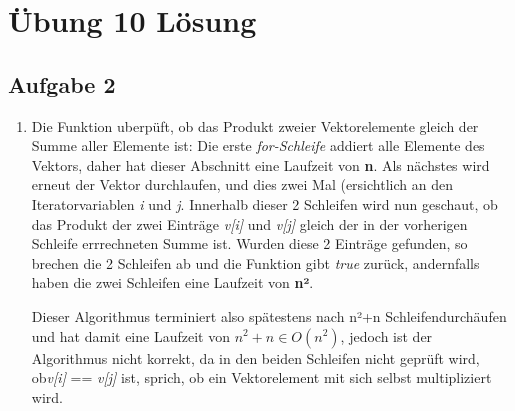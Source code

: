 \documentclass{article}
\begin{document}
\section*{Übung 10 Lösung}

    \subsection*{Aufgabe 2}

    \begin{enumerate}[label=(\alph*)]

        \item Die Funktion uberpüft, ob das Produkt zweier Vektorelemente gleich der Summe aller Elemente ist:
	\newline\newline
	Die erste \textit{for-Schleife} addiert alle Elemente des Vektors, daher hat dieser Abschnitt eine Laufzeit von \textbf{n}.
	Als nächstes wird erneut  der Vektor durchlaufen, und dies zwei Mal (ersichtlich an den Iteratorvariablen \textit{i} und \textit{j}.
	Innerhalb dieser 2 Schleifen wird nun geschaut, ob das Produkt der zwei Einträge \textit{v[i]} und \textit{v[j]} gleich der in der vorherigen Schleife errrechneten
	Summe ist. Wurden diese 2 Einträge gefunden, so brechen die 2 Schleifen ab und die Funktion gibt \textit{true} zurück, andernfalls haben die zwei Schleifen
	eine Laufzeit von \textbf{n²}.

	Dieser Algorithmus terminiert also spätestens nach n²+n Schleifendurchäufen und hat damit eine Laufzeit von $n^{2}+n \in O(n^{2})$, jedoch 
	ist der Algorithmus nicht
	korrekt, da in den beiden Schleifen nicht geprüft wird, ob\newline \textit{v[i]} == \textit{v[j]}
	ist, sprich, ob ein Vektorelement mit sich selbst multipliziert wird.  
	

    \end{enumerate}
\end{document}
